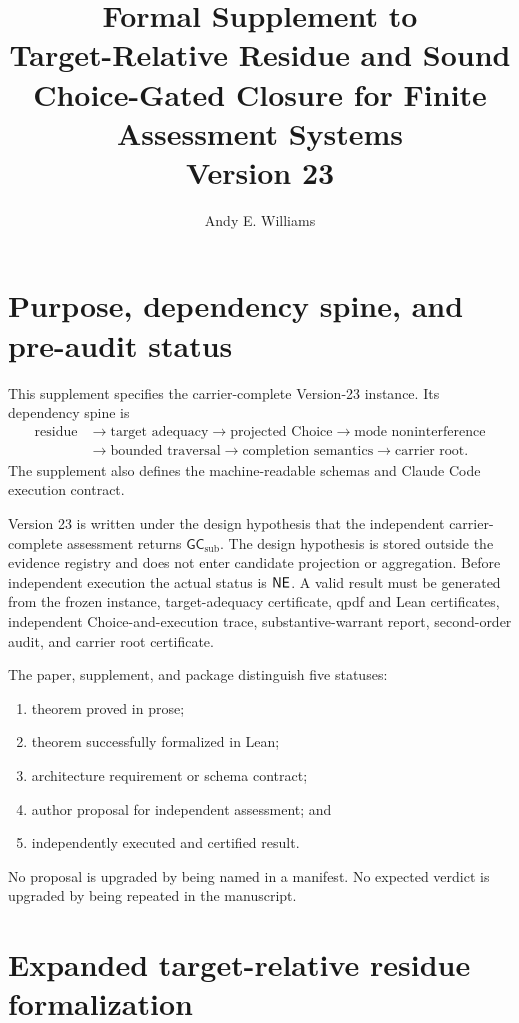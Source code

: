 \documentclass[10pt]{article}
\title{Formal Supplement to\\Target-Relative Residue and Sound Choice-Gated Closure for Finite Assessment Systems\\Version 23}
\author{Andy E. Williams}
\date{}
\newcommand{\GCsub}{\mathsf{GC}_{\mathrm{sub}}}
\begin{document}
\maketitle
\tableofcontents


\section{Purpose, dependency spine, and pre-audit status}

This supplement specifies the carrier-complete Version-23 instance.  Its dependency spine is
\[
\begin{aligned}
\text{residue}&\to\text{target adequacy}\to\text{projected Choice}\to\text{mode noninterference}\\
&\to\text{bounded traversal}\to\text{completion semantics}\to\text{carrier root}.
\end{aligned}
\]
The supplement also defines the machine-readable schemas and Claude Code execution contract.

Version 23 is written under the design hypothesis that the independent carrier-complete assessment returns $\GCsub$.  The design hypothesis is stored outside the evidence registry and does not enter candidate projection or aggregation.  Before independent execution the actual status is $\mathsf{NE}$.  A valid result must be generated from the frozen instance, target-adequacy certificate, qpdf and Lean certificates, independent Choice-and-execution trace, substantive-warrant report, second-order audit, and carrier root certificate.

The paper, supplement, and package distinguish five statuses:
\begin{enumerate}
  \item theorem proved in prose;
  \item theorem successfully formalized in Lean;
  \item architecture requirement or schema contract;
  \item author proposal for independent assessment; and
  \item independently executed and certified result.
\end{enumerate}
No proposal is upgraded by being named in a manifest.  No expected verdict is upgraded by being repeated in the manuscript.

\section{Expanded target-relative residue formalization}
\end{document}
